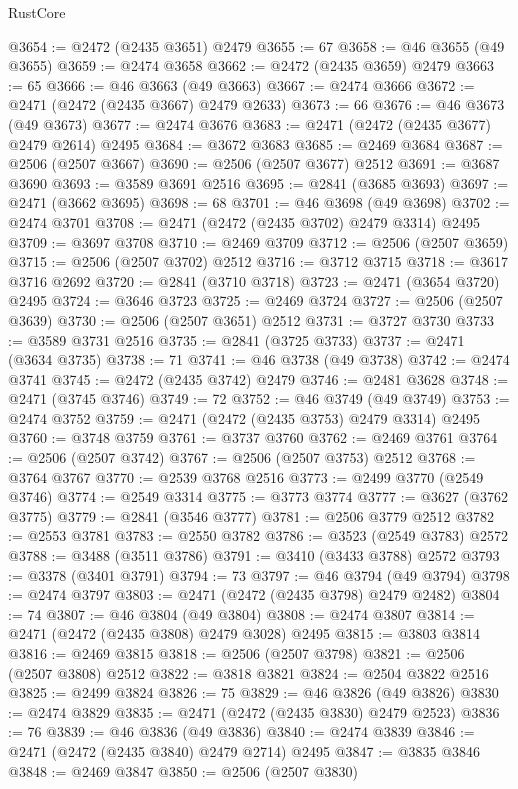 \begin{lexlean}{RustCore}
\begin{coremodule}
@3654 := @2472 (@2435 @3651) @2479
@3655 := 67
@3658 := @46 @3655 (@49 @3655)
@3659 := @2474 @3658
@3662 := @2472 (@2435 @3659) @2479
@3663 := 65
@3666 := @46 @3663 (@49 @3663)
@3667 := @2474 @3666
@3672 := @2471 (@2472 (@2435 @3667) @2479 @2633)
@3673 := 66
@3676 := @46 @3673 (@49 @3673)
@3677 := @2474 @3676
@3683 := @2471 (@2472 (@2435 @3677) @2479 @2614) @2495
@3684 := @3672 @3683
@3685 := @2469 @3684
@3687 := @2506 (@2507 @3667)
@3690 := @2506 (@2507 @3677) @2512
@3691 := @3687 @3690
@3693 := @3589 @3691 @2516
@3695 := @2841 (@3685 @3693)
@3697 := @2471 (@3662 @3695)
@3698 := 68
@3701 := @46 @3698 (@49 @3698)
@3702 := @2474 @3701
@3708 := @2471 (@2472 (@2435 @3702) @2479 @3314) @2495
@3709 := @3697 @3708
@3710 := @2469 @3709
@3712 := @2506 (@2507 @3659)
@3715 := @2506 (@2507 @3702) @2512
@3716 := @3712 @3715
@3718 := @3617 @3716 @2692
@3720 := @2841 (@3710 @3718)
@3723 := @2471 (@3654 @3720) @2495
@3724 := @3646 @3723
@3725 := @2469 @3724
@3727 := @2506 (@2507 @3639)
@3730 := @2506 (@2507 @3651) @2512
@3731 := @3727 @3730
@3733 := @3589 @3731 @2516
@3735 := @2841 (@3725 @3733)
@3737 := @2471 (@3634 @3735)
@3738 := 71
@3741 := @46 @3738 (@49 @3738)
@3742 := @2474 @3741
@3745 := @2472 (@2435 @3742) @2479
@3746 := @2481 @3628
@3748 := @2471 (@3745 @3746)
@3749 := 72
@3752 := @46 @3749 (@49 @3749)
@3753 := @2474 @3752
@3759 := @2471 (@2472 (@2435 @3753) @2479 @3314) @2495
@3760 := @3748 @3759
@3761 := @3737 @3760
@3762 := @2469 @3761
@3764 := @2506 (@2507 @3742)
@3767 := @2506 (@2507 @3753) @2512
@3768 := @3764 @3767
@3770 := @2539 @3768 @2516
@3773 := @2499 @3770 (@2549 @3746)
@3774 := @2549 @3314
@3775 := @3773 @3774
@3777 := @3627 (@3762 @3775)
@3779 := @2841 (@3546 @3777)
@3781 := @2506 @3779 @2512
@3782 := @2553 @3781
@3783 := @2550 @3782
@3786 := @3523 (@2549 @3783) @2572
@3788 := @3488 (@3511 @3786)
@3791 := @3410 (@3433 @3788) @2572
@3793 := @3378 (@3401 @3791)
@3794 := 73
@3797 := @46 @3794 (@49 @3794)
@3798 := @2474 @3797
@3803 := @2471 (@2472 (@2435 @3798) @2479 @2482)
@3804 := 74
@3807 := @46 @3804 (@49 @3804)
@3808 := @2474 @3807
@3814 := @2471 (@2472 (@2435 @3808) @2479 @3028) @2495
@3815 := @3803 @3814
@3816 := @2469 @3815
@3818 := @2506 (@2507 @3798)
@3821 := @2506 (@2507 @3808) @2512
@3822 := @3818 @3821
@3824 := @2504 @3822 @2516
@3825 := @2499 @3824
@3826 := 75
@3829 := @46 @3826 (@49 @3826)
@3830 := @2474 @3829
@3835 := @2471 (@2472 (@2435 @3830) @2479 @2523)
@3836 := 76
@3839 := @46 @3836 (@49 @3836)
@3840 := @2474 @3839
@3846 := @2471 (@2472 (@2435 @3840) @2479 @2714) @2495
@3847 := @3835 @3846
@3848 := @2469 @3847
@3850 := @2506 (@2507 @3830)

\end{coremodule}
\end{lexlean}
